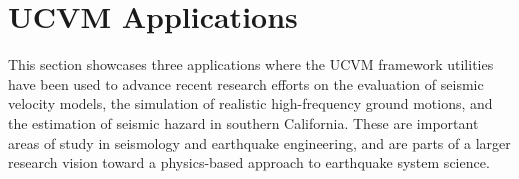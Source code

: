 
\section{UCVM Applications}

This section showcases three applications where the UCVM framework utilities have been used to advance recent research efforts on the evaluation of seismic velocity models, the simulation of realistic high-frequency ground motions, and the estimation of seismic hazard in southern California. These are important areas of study in seismology and earthquake engineering, and are parts of a larger research vision toward a physics-based approach to earthquake system science.








